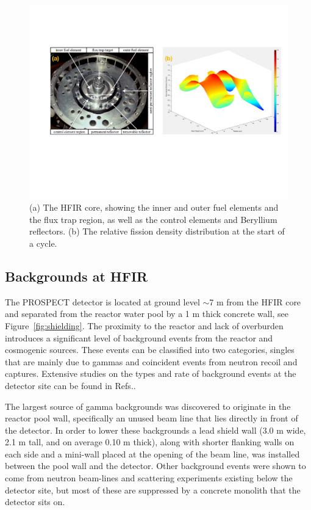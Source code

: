 \begin{figure}[t]
	\centering
	\includegraphics[width=0.9\linewidth]{tex/4-prospect-images/HFIR}
	\caption[The HFIR core and flux distribution]{(a) The HFIR core, showing the inner and outer fuel elements and the flux trap region, as well as the control elements and Beryllium reflectors. (b) The relative fission density distribution at the start of a cycle. \cite{HFIRTech}}
	\label{fig:hfir}
\end{figure}

\subsection{Backgrounds at HFIR}

The PROSPECT detector is located at ground level $\sim$7 m from the HFIR core and separated from the reactor water pool by a 1 m thick concrete wall, see Figure~\ref{fig:shielding}.
The proximity to the reactor and lack of overburden introduces a significant level of background events from the reactor and cosmogenic sources. 
These events can be classified into two categories, singles that are mainly due to gammas and coincident events from neutron recoil and captures. 
Extensive studies on the types and rate of background events at the detector site can be found in Refs.\cite{Ashenfelter:2015tpm,Heffron,Hackett}.

The largest source of gamma backgrounds was discovered to originate in the reactor pool wall, specifically an unused beam line that lies directly in front of the detector. 
In order to lower these backgrounds a lead shield wall (3.0 m wide, 2.1 m tall, and on average 0.10 m thick), along with shorter flanking walls on each side and a mini-wall placed at the opening of the beam line, was installed between the pool wall and the detector.
Other background events were shown to come from neutron beam-lines and scattering experiments existing below the detector site, but most of these are suppressed by a concrete monolith that the detector sits on.

